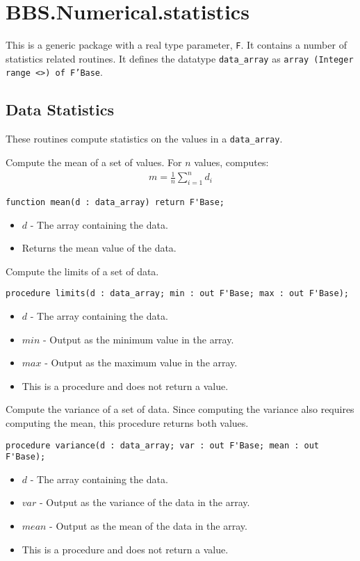 \documentclass[10pt, openany]{book}
\newcommand{\datatype}[1]{\texttt{#1}}
\begin{document}
\section{BBS.Numerical.statistics}
This is a generic package with a real type parameter, \datatype{F}.  It contains a number of statistics related routines.  It defines the datatype \datatype{data\_array} as \datatype{array (Integer range <>) of F'Base}.

\subsection{Data Statistics}
These routines compute statistics on the values in a \datatype{data\_array}.

Compute the mean of a set of values.  For $n$ values, computes:
\begin{align*}
  m = \frac{1}{n}\sum_{i=1}^n d_i
\end{align*}
\begin{lstlisting}
function mean(d : data_array) return F'Base;
\end{lstlisting}
\begin{itemize}
  \item $d$ - The array containing the data.
  \item Returns the mean value of the data.
\end{itemize}

Compute the limits of a set of data.
\begin{lstlisting}
procedure limits(d : data_array; min : out F'Base; max : out F'Base);
\end{lstlisting}
\begin{itemize}
  \item $d$ - The array containing the data.
  \item $min$ - Output as the minimum value in the array.
  \item $max$ - Output as the maximum value in the array.
  \item This is a procedure and does not return a value.
\end{itemize}

Compute the variance of a set of data.  Since computing the variance also requires computing the mean, this procedure returns both values.
\begin{lstlisting}
procedure variance(d : data_array; var : out F'Base; mean : out F'Base);
\end{lstlisting}
\begin{itemize}
  \item $d$ - The array containing the data.
  \item $var$ - Output as the variance of the data in the array.
  \item $mean$ - Output as the mean of the data in the array.
  \item This is a procedure and does not return a value.
\end{itemize}
\end{document}
